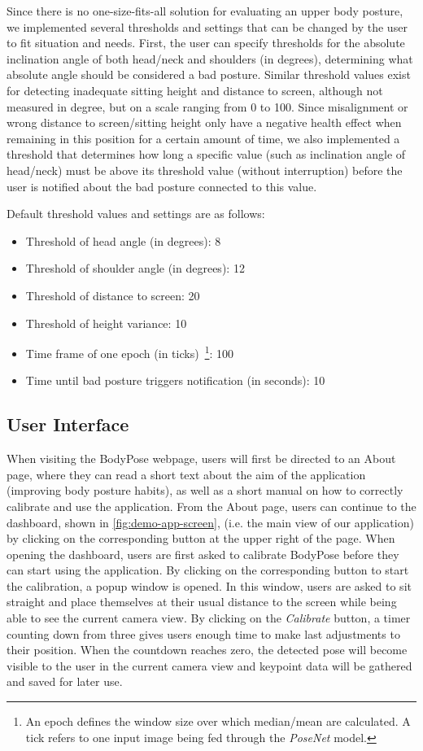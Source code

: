 Since there is no one-size-fits-all solution for evaluating an upper body posture, we implemented several thresholds and settings that can be changed by the user to fit situation and needs. First, the user can specify thresholds for the absolute inclination angle of both head/neck and shoulders (in degrees), determining what absolute angle should be considered a bad posture. Similar threshold values exist for detecting inadequate sitting height and distance to screen, although not measured in degree, but on a scale ranging from 0 to 100. Since misalignment or wrong distance to screen/sitting height only have a negative health effect when remaining in this position for a certain amount of time, we also implemented a threshold that determines how long a specific value (such as inclination angle of head/neck) must be above its threshold value (without interruption) before the user is notified about the bad posture connected to this value. 

Default threshold values and settings are as follows: 
\begin{itemize}
    \item Threshold of head angle (in degrees): 8
    \item Threshold of shoulder angle (in degrees): 12
    \item Threshold of distance to screen: 20
    \item Threshold of height variance: 10
    \item Time frame of one epoch (in ticks)~\footnote{An epoch defines the window size over which median/mean are calculated. A tick refers to one input image being fed through the \textit{PoseNet} model.}: 100
    \item Time until bad posture triggers notification (in seconds): 10
\end{itemize}


\subsection{User Interface}
\label{user_interface}
When visiting the BodyPose webpage, users will first be directed to an About page, where they can read a short text about the aim of the application (improving body posture habits), as well as a short manual on how to correctly calibrate and use the application. From the About page, users can continue to the dashboard, shown in \autoref{fig:demo-app-screen}, (i.e. the main view of our application) by clicking on the corresponding button at the upper right of the page. When opening the dashboard, users are first asked to calibrate BodyPose before they can start using the application. By clicking on the corresponding button to start the calibration, a popup window is opened. In this window, users are asked to sit straight and place themselves at their usual distance to the screen while being able to see the current camera view. By clicking on the \textit{Calibrate} button, a timer counting down from three gives users enough time to make last adjustments to their position. When the countdown reaches zero, the detected pose will become visible to the user in the current camera view and keypoint data will be gathered and saved for later use. 

